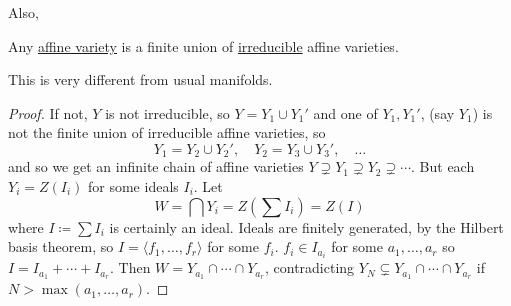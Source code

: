 \documentclass{article}
\begin{document}
\begin{eg}
    \leavevmode
    \begin{center}
    \end{center}
    Also,
    \begin{center}
    \end{center}
\end{eg}
\begin{prop}
    Any \hyperlink{def:Z}{affine variety} is a finite union of \hyperlink{def:reducible}{irreducible} affine varieties.
\end{prop}
\begin{remark}
    This is very different from usual manifolds.
\end{remark}
\begin{proof}
    If not, $Y$ is not irreducible, so $Y = Y_1 \cup Y_1'$ and one of $Y_1, Y_1'$, (say $Y_1$) is not the finite union of irreducible affine varieties, so
    \begin{equation*}
        Y_1 = Y_2 \cup Y_2',\quad Y_2 = Y_3 \cup Y_3',\quad \dotsc
    \end{equation*}
    and so we get an infinite chain of affine varieties $Y \supsetneq Y_1 \supsetneq Y_2 \supsetneq \dotsb$.
    But each $Y_i = Z(I_i)$ for some ideals $I_i$.  Let
    \begin{equation*}
        W = \bigcap Y_i = Z\left(\sum I_i\right) = Z(I)
    \end{equation*}
    where $I \coloneqq \sum I_i$ is certainly an ideal.
    Ideals are finitely generated, by the Hilbert basis theorem, so $I = \langle f_1, \dotsc, f_r \rangle$ for some $f_i$.
    $f_i \in I_{a_i}$ for some $a_1, \dotsc, a_r$ so $I = I_{a_1} + \dotsb + I_{a_r}$.
    Then $W = Y_{a_1} \cap \dotsb \cap Y_{a_r}$, contradicting $Y_N \subsetneq Y_{a_1} \cap \dotsb \cap Y_{a_r}$ if $N > \max(a_1, \dotsc, a_r)$.
\end{proof}
\end{document}
